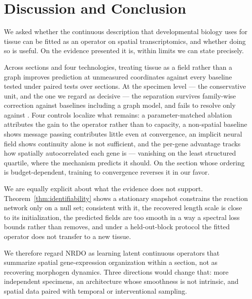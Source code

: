 \section{Discussion and Conclusion}

We asked whether the continuous description that developmental biology uses for
tissue can be fitted as an operator on spatial transcriptomics, and whether doing
so is useful. On the evidence presented it is, within limits we can state
precisely.

Across \MSSections{} sections and four technologies, treating tissue as a field
rather than a graph improves prediction at unmeasured coordinates against every
baseline tested under paired tests over sections. At the specimen level --- the
conservative unit, and the one we regard as decisive --- the separation survives
family-wise correction against \MSSpecNSig{} baselines including a graph model,
and fails to resolve only against \MSSpecGraphWorstModel{}. Four controls localize what remains: a
parameter-matched ablation attributes the gain to the operator rather than to
capacity, a non-spatial baseline shows message passing contributes little even at
convergence, an implicit neural field shows continuity alone is not
sufficient, and the per-gene advantage tracks how spatially autocorrelated each
gene is --- vanishing on the least structured quartile, where the mechanism
predicts it should. On the section whose ordering is budget-dependent, training to
convergence reverses it in our favor.

We are equally explicit about what the evidence does not support.
Theorem~\ref{thm:identifiability} shows a stationary snapshot constrains the
reaction network only on a null set; consistent with it, the recovered length
scale is close to its initialization, the predicted fields are too smooth in a
way a spectral loss bounds rather than removes, and under a held-out-block
protocol the fitted operator does not transfer to a new tissue.

We therefore regard NRDO as learning latent continuous operators that summarize
spatial gene-expression organization within a section, not as recovering
morphogen dynamics. Three directions would change that: more independent
specimens, an architecture whose smoothness is not intrinsic, and spatial data
paired with temporal or interventional sampling.

\label{endofmain}
